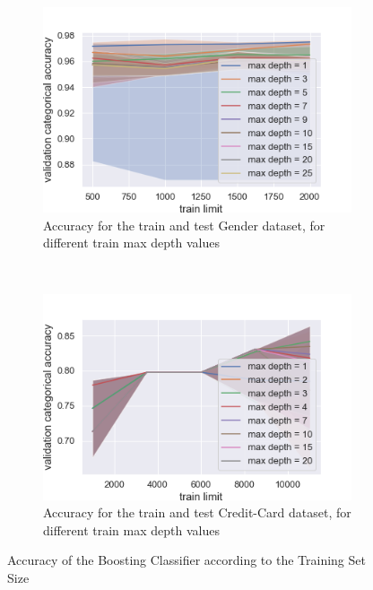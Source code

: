 \documentclass[10pt]{article}
\begin{document}
		\paragraph*{}
			\begin{figure}[h]
				\centering
				\begin{subfigure}[]{0.45\columnwidth}
					\centering
					\includegraphics[width=\linewidth]{../graphics/boost_gender_train_limit_score_type_max_depth.png}
					\caption{Accuracy for the train and test Gender dataset, for different train max depth values}
					\label{boost:g_train_limit}
				\end{subfigure}
				~
				\begin{subfigure}[]{0.45\columnwidth}
					\centering
					\includegraphics[width=\linewidth]{../graphics/boost_creditcard_train_limit_score_type_max_depth.png}
					\caption{Accuracy for the train and test Credit-Card dataset, for different train max depth values}
					\label{boost:cc_train_limit}
				\end{subfigure}
				\caption{Accuracy of the Boosting Classifier according to the Training Set Size}
				\label{boost:train_limit}
			\end{figure}
\end{document}
